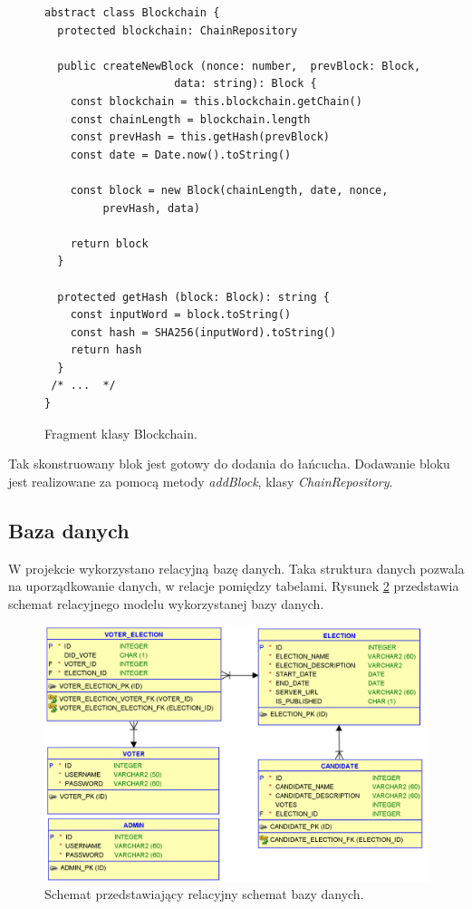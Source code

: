 \documentclass[a4paper,12pt]{book}
\begin{document}
\newpage
\begin{figure}  
  \centering
\begin{lstlisting}[style=ES6]
abstract class Blockchain {
  protected blockchain: ChainRepository

  public createNewBlock (nonce: number,  prevBlock: Block, 
					data: string): Block {
    const blockchain = this.blockchain.getChain()
    const chainLength = blockchain.length
    const prevHash = this.getHash(prevBlock)
    const date = Date.now().toString()

    const block = new Block(chainLength, date, nonce,
		 prevHash, data)

    return block
  }

  protected getHash (block: Block): string {
    const inputWord = block.toString()
    const hash = SHA256(inputWord).toString()
    return hash
  }
 /* ...  */
}
\end{lstlisting}
\caption{Fragment klasy Blockchain.}
\label{Blockchain1.ts}
\end{figure}
Tak skonstruowany blok jest gotowy do dodania do łańcucha. Dodawanie bloku jest realizowane za pomocą metody \textit{addBlock}, klasy \textit{ChainRepository}.

\subsection{Baza danych}

W projekcie wykorzystano relacyjną bazę danych. Taka struktura danych pozwala na uporządkowanie danych, w relacje pomiędzy tabelami. Rysunek \ref{database} przedstawia schemat relacyjnego modelu wykorzystanej bazy danych.

\begin{figure}[h]
    	\centering
	\includegraphics[width=\textwidth]{images/Relational.png}
	\caption{Schemat przedstawiający relacyjny schemat bazy danych.}\label{database}
\end {figure}
\end{document}
